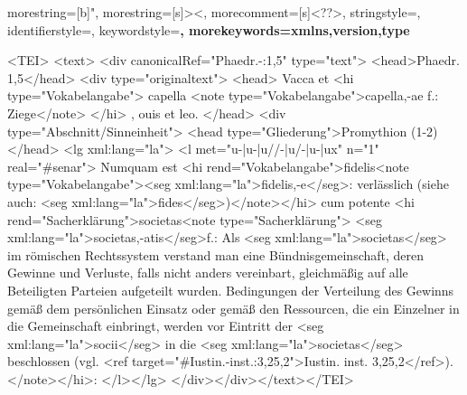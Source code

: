 
\usepackage{listings}
{
  morestring=[b]",
  morestring=[s]{>}{<},
  morecomment=[s]{<?}{?>},
  stringstyle=\color{Text},
  identifierstyle=\color{Element}\upshape,
  keywordstyle=\color{Attr}\bfseries,
  morekeywords={xmlns,version,type}%
}


\begin{lstinputlisting}%
<TEI>
<text>
<div canonicalRef="Phaedr.-:1,5" type="text">
<head>Phaedr. 1,5</head>
<div type="originaltext">
<head>
Vacca et
<hi type="Vokabelangabe">
capella
<note type="Vokabelangabe">capella,-ae f.: Ziege</note>
</hi>
, ouis et leo.
</head>
<div type="Abschnitt/Sinneinheit">
<head type="Gliederung">Promythion (1-2)</head>
<lg xml:lang="la">
<l met="u-|u-|u//-|u/-|u-|ux" n="1" real="#senar">
Numquam est
<hi rend="Vokabelangabe">fidelis<note type="Vokabelangabe"><seg xml:lang="la">fidelis,-e</seg>: verlässlich (siehe auch: <seg xml:lang="la">fides</seg>)</note></hi>
cum potente <hi rend="Sacherklärung">societas<note type="Sacherklärung">
<seg xml:lang="la">societas,-atis</seg>f.: Als <seg xml:lang="la">societas</seg> im römischen Rechtssystem verstand man eine Bündnisgemeinschaft, deren Gewinne und Verluste, falls nicht anders vereinbart, gleichmäßig auf alle Beteiligten Parteien aufgeteilt wurden. Bedingungen der Verteilung des Gewinns gemäß dem persönlichen Einsatz oder gemäß den Ressourcen, die ein Einzelner in die Gemeinschaft einbringt, werden vor Eintritt der <seg xml:lang="la">socii</seg> in die <seg xml:lang="la">societas</seg> beschlossen (vgl. <ref target="#Iustin.-inst.:3,25,2">Iustin. inst. 3,25,2</ref>).</note></hi>:
</l></lg>
</div></div></text></TEI>
\end{lstinputlisting}